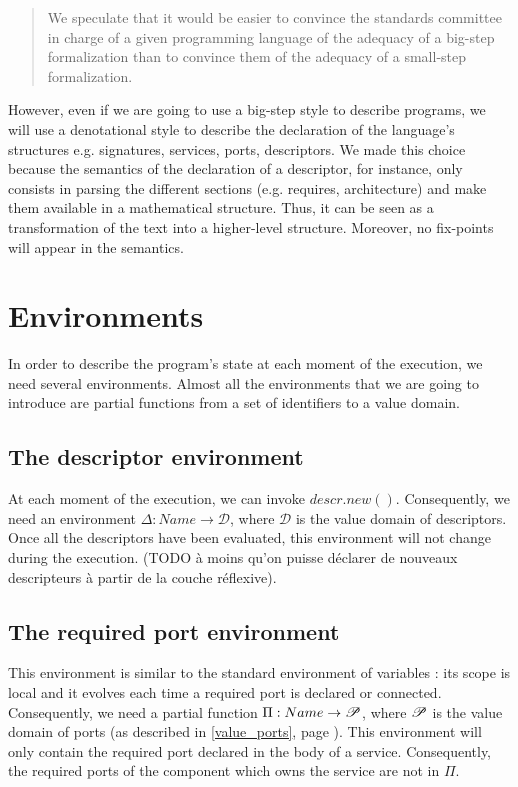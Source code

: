 \blockquote{We speculate that it would be easier to convince the standards committee in charge of a given programming language of the adequacy of a big-step formalization than to convince them of the adequacy of a small-step formalization.}{\cite{Cha13}}

However, even if we are going to use a big-step style to describe programs, we will use a denotational style to describe the declaration of the language's structures e.g. signatures, services, ports, descriptors. We made this choice because the semantics of the declaration of a descriptor, for instance, only consists in parsing the different sections (e.g. requires, architecture) and make them available in a mathematical structure. Thus, it can be seen as a transformation of the text into a higher-level structure. Moreover, no fix-points will appear in the semantics.



\section{Environments}
In order to describe the program's state at each moment of the execution, we need several environments. Almost all the environments that we are going to introduce are partial functions from a set of identifiers to a value domain.

\subsection{The descriptor environment}
At each moment of the execution, we can invoke $descr.new()$. Consequently, we need an environment  $\Delta : Name \rightarrow \mathcal{D}$, where $\mathcal{D}$ is the value domain of descriptors. Once all the descriptors have been evaluated, this environment will not change during the execution.
 (TODO à moins qu'on puisse déclarer de nouveaux descripteurs à partir de la couche réflexive).

\subsection{The required port environment}
This environment is similar to the standard environment of variables : its scope is local and it evolves each time a required port is declared or connected. Consequently, we need a partial function $\Pi : Name \rightarrow \mathcal{P}$, where $\mathcal{P}$ is the value domain of ports (as described in \ref{value_ports}, page \pageref{value_ports}). This environment will only contain the required port declared in the body of a service. Consequently, the required ports of the component which owns the service are not in $\Pi$.


